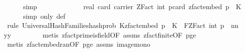 \begin{isabellebody}
\ \ \ \ \isamarkupfalse%
\ simp\isanewline
\ \ \isamarkupfalse%
\ \isamarkupfalse%
\ {\isachardoublequoteopen}{\isachardot}{\kern0pt}{\isachardot}{\kern0pt}{\isachardot}{\kern0pt}\ {\isacharequal}{\kern0pt}\isanewline
\ \ \ \ {}\ {\isacharslash}{\kern0pt}\ real\ {\isacharparenleft}{\kern0pt}card\ {\isacharparenleft}{\kern0pt}carrier\ {\isacharparenleft}{\kern0pt}ZFact\ {\isacharparenleft}{\kern0pt}int\ p{\isacharparenright}{\kern0pt}{\isacharparenright}{\kern0pt}{\isacharparenright}{\kern0pt}{\isacharparenright}{\kern0pt}{\isacharcircum}{\kern0pt}{\isacharparenleft}{\kern0pt}card\ {\isacharparenleft}{\kern0pt}zfact{\isacharunderscore}{\kern0pt}embed\ p\ {\isacharbackquote}{\kern0pt}\ K{\isacharparenright}{\kern0pt}{\isacharparenright}{\kern0pt}{\isachardoublequoteclose}\isanewline
\ \ \ \ \isamarkupfalse%
\ {\isacharparenleft}{\kern0pt}simp\ only{\isacharcolon}{\kern0pt}\ {\isasymOmega}{\isacharunderscore}{\kern0pt}def{\isacharparenright}{\kern0pt}\isanewline
\ \ \ \ \isamarkupfalse%
\ {\isacharparenleft}{\kern0pt}rule\ Universal{\isacharunderscore}{\kern0pt}Hash{\isacharunderscore}{\kern0pt}Families{\isachardot}{\kern0pt}hash{\isacharunderscore}{\kern0pt}prob{\isacharbrackleft}{\kern0pt}\ K{\isacharequal}{\kern0pt}{\isachardoublequoteopen}zfact{\isacharunderscore}{\kern0pt}embed\ p\ {\isacharbackquote}{\kern0pt}\ K{\isachardoublequoteclose}\ \ F{\isacharequal}{\kern0pt}{\isachardoublequoteopen}ZFact\ {\isacharparenleft}{\kern0pt}int\ p{\isacharparenright}{\kern0pt}{\isachardoublequoteclose}\ \ n{\isacharequal}{\kern0pt}{\isachardoublequoteopen}n{\isachardoublequoteclose}\ \ y{\isacharequal}{\kern0pt}{\isachardoublequoteopen}y{\isacharprime}{\kern0pt}{\isachardoublequoteclose}{\isacharbrackright}{\kern0pt}{\isacharparenright}{\kern0pt}\isanewline
\ \ \ \ \ \ \ \isamarkupfalse%
\ {\isacharparenleft}{\kern0pt}metis\ zfact{\isacharunderscore}{\kern0pt}prime{\isacharunderscore}{\kern0pt}is{\isacharunderscore}{\kern0pt}field{\isacharbrackleft}{\kern0pt}OF\ assms{\isacharparenleft}{\kern0pt}{}{\isacharparenright}{\kern0pt}{\isacharbrackright}{\kern0pt}\ zfact{\isacharunderscore}{\kern0pt}finite{\isacharbrackleft}{\kern0pt}OF\ p{\isacharunderscore}{\kern0pt}ge{\isacharunderscore}{\kern0pt}{}{\isacharbrackright}{\kern0pt}{\isacharparenright}{\kern0pt}\isanewline
\ \ \ \ \ \ \isamarkupfalse%
\ {\isacharparenleft}{\kern0pt}metis\ zfact{\isacharunderscore}{\kern0pt}embed{\isacharunderscore}{\kern0pt}ran{\isacharbrackleft}{\kern0pt}OF\ p{\isacharunderscore}{\kern0pt}ge{\isacharunderscore}{\kern0pt}{}{\isacharbrackright}{\kern0pt}\ assms{\isacharparenleft}{\kern0pt}{}{\isacharparenright}{\kern0pt}\ image{\isacharunderscore}{\kern0pt}mono{\isacharparenright}{\kern0pt}\isanewline

\end{isabellebody}
